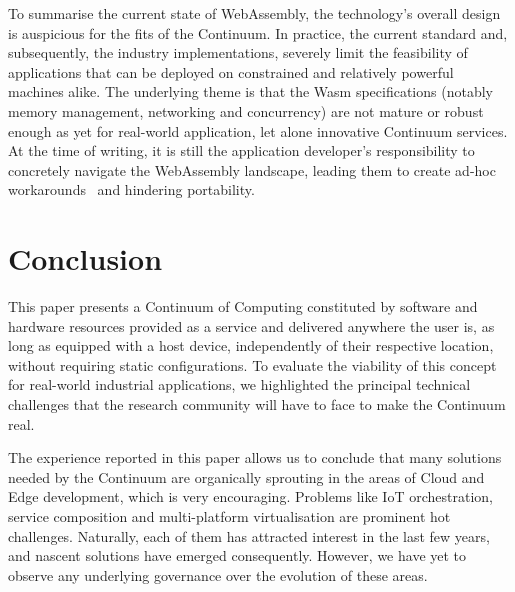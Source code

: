 To summarise the current state of WebAssembly, the technology's overall design is auspicious for the fits of the Continuum. In practice, the current standard and, subsequently, the industry implementations, severely limit the feasibility of applications that can be deployed on constrained and relatively powerful machines alike. The underlying theme is that the Wasm specifications (notably memory management, networking and concurrency) are not mature or robust enough as yet for real-world application, let alone innovative Continuum services. 
At the time of writing, it is still the application developer's responsibility to concretely navigate the WebAssembly landscape, leading them to create ad-hoc workarounds~\cite{wasm-experimental-http} and hindering portability.

\section{Conclusion}
\label{sec:conclusion}

This paper presents a Continuum of Computing constituted by software and hardware resources provided as a service and delivered anywhere the user is, as long as equipped with a host device, independently of their respective location, without requiring static configurations.
To evaluate the viability of this concept for real-world industrial applications, we highlighted the principal technical challenges that the research community will have to face to make the Continuum real. 


The experience reported in this paper allows us to conclude that many solutions needed by the Continuum are organically sprouting in the areas of Cloud and Edge development, which is very encouraging. Problems like IoT orchestration, service composition and multi-platform virtualisation are prominent hot challenges. Naturally, each of them has attracted interest in the last few years, and nascent solutions have emerged consequently. However, we have yet to observe any underlying governance over the evolution of these areas.

